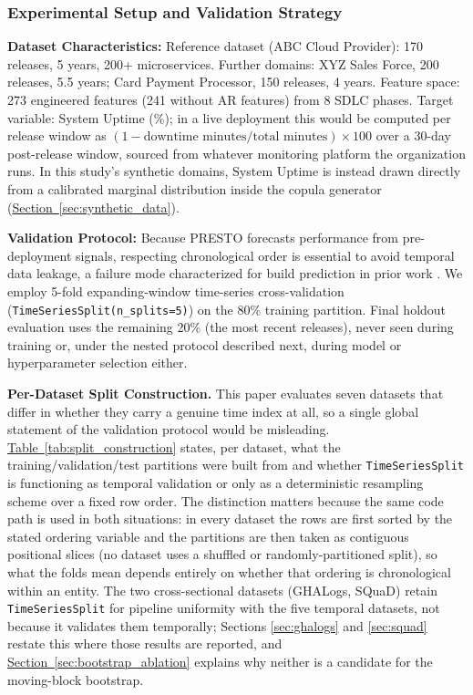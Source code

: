 \documentclass[technologies,article,submit,pdftex,moreauthors]{Definitions/mdpi}
\begin{document}
\subsubsection{Experimental Setup and Validation Strategy}\label{sec:exp_setup_validation}

\textbf{Dataset Characteristics:} Reference dataset (ABC Cloud Provider): 170 releases, 5 years, 200+ microservices. Further domains: XYZ Sales Force, 200 releases, 5.5 years; Card Payment Processor, 150 releases, 4 years. Feature space: 273 engineered features (241 without AR features) from 8 SDLC phases. Target variable: System Uptime (\%); in a live deployment this would be computed per release window as \((1 - \text{downtime minutes}/\text{total minutes}) \times 100\) over a 30-day post-release window, sourced from whatever monitoring platform the organization runs. In this study's synthetic domains, System Uptime is instead drawn directly from a calibrated marginal distribution inside the copula generator (\hyperref[sec:synthetic_data]{Section~\ref*{sec:synthetic_data}}).

\textbf{Validation Protocol:} Because PRESTO forecasts performance from pre-deployment signals, respecting chronological order is essential to avoid temporal data leakage, a failure mode characterized for build prediction in prior work \citep{mishra2026leakage}. We employ 5-fold expanding-window time-series cross-validation (\texttt{TimeSeriesSplit(n\_splits=5)}) on the 80\% training partition. Final holdout evaluation uses the remaining 20\% (the most recent releases), never seen during training or, under the nested protocol described next, during model or hyperparameter selection either.

\textbf{Per-Dataset Split Construction.} This paper evaluates seven datasets that differ in whether they carry a genuine time index at all, so a single global statement of the validation protocol would be misleading. \hyperref[tab:split_construction]{Table~\ref*{tab:split_construction}} states, per dataset, what the training/validation/test partitions were built from and whether \texttt{TimeSeriesSplit} is functioning as temporal validation or only as a deterministic resampling scheme over a fixed row order. The distinction matters because the same code path is used in both situations: in every dataset the rows are first sorted by the stated ordering variable and the partitions are then taken as contiguous positional slices (no dataset uses a shuffled or randomly-partitioned split), so what the folds mean depends entirely on whether that ordering is chronological within an entity. The two cross-sectional datasets (GHALogs, SQuaD) retain \texttt{TimeSeriesSplit} for pipeline uniformity with the five temporal datasets, not because it validates them temporally; Sections \hyperref[sec:ghalogs]{\ref*{sec:ghalogs}} and \hyperref[sec:squad]{\ref*{sec:squad}} restate this where those results are reported, and \hyperref[sec:bootstrap_ablation]{Section~\ref*{sec:bootstrap_ablation}} explains why neither is a candidate for the moving-block bootstrap.
\end{document}
